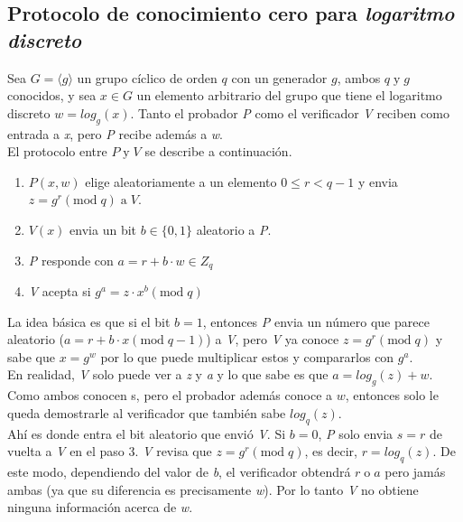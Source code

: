 \documentclass[oneside,10pt]{article}
\begin{document}
\subsection{Protocolo de conocimiento cero para \emph{logaritmo discreto}}\cite{chris-chan}
Sea $G = \langle g \rangle$ un grupo cíclico de orden $q$ con un generador $g$, ambos $q \; \mathrm{y} \; g$ conocidos, y sea $x \in G$ un elemento arbitrario del grupo que tiene el logaritmo discreto $w = log_g(x)$. Tanto el probador \emph{P}
como el verificador \emph{V} reciben como entrada a \emph{x}, pero \emph{P} recibe además a \emph{w}.\\
El protocolo entre $P \; \mathrm{y} \; V$ se describe a continuación.
\begin{enumerate}
\item $P(x,w)$ elige aleatoriamente a un elemento $ 0 \leq r < q-1$ y envia $z = g^r (\mathrm{mod}\; q) \; \mathrm{a} \; V$.
\item $V(x)$ envia un bit  $b \in \{0,1\}$ aleatorio a \emph{P}. 
\item \emph{P} responde con $a = r + b \cdot w \in Z_q$
\item \emph{V} acepta si $g^a = z \cdot x^b (\mathrm{mod}\; q)$
\end{enumerate}
La idea básica es que si el bit $b = 1$, entonces \emph{P} envia un número que parece aleatorio ($a = r + b \cdot x (\mathrm{mod}\; q-1)$) a \emph{V}, pero \emph{V} ya conoce $z = g^r (\mathrm{mod}\; q)$ y sabe que $x = g^w$ por lo que puede multiplicar estos y compararlos con $g^a$. \\
En realidad, \emph{V} solo puede ver a \emph{z} y \emph{a} y lo que sabe es que $a = log_g(z) + w$. Como ambos conocen s, pero el probador además conoce a $w$, entonces solo le queda demostrarle al verificador que también sabe $log_q(z)$. \\
Ahí es donde entra el bit aleatorio que envió \emph{V}. Si $b=0$, \emph{P} solo envia $s=r$ de vuelta a \emph{V} en el paso 3. \emph{V} revisa que $z=g^r (\mathrm{mod}\; q)$, es decir, $r = log_q(z)$. De este modo, dependiendo del valor de \emph{b}, el verificador obtendrá $r \; \mathrm{o} \; a$ pero jamás ambas (ya que su diferencia es precisamente \emph{w}). Por lo tanto \emph{V} no obtiene ninguna información acerca de \emph{w}.
\end{document}
